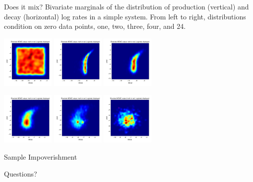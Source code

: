 \documentclass[12pt,a4paper,t,xcolor=dvipsnames,slidestop,compress,mathserif]{beamer}
\begin{document}
\begin{frame}{Does it mix?}
Bivariate marginals of the distribution of production (vertical) and decay (horizontal) log rates in a simple system. From left to right, distributions condition on zero data points, one, two, three, four, and 24.
\begin{center}
\includegraphics[height=1in,width=1in]{simple_million_stagewise_plots/dist0_contour_decay_prod.png}
\includegraphics[height=1in,width=1in]{simple_million_stagewise_plots/dist1_contour_decay_prod.png}
\includegraphics[height=1in,width=1in]{simple_million_stagewise_plots/dist2_contour_decay_prod.png}
\end{center}
\begin{center}
\includegraphics[height=1in,width=1in]{simple_million_stagewise_plots/dist3_contour_decay_prod.png}
\includegraphics[height=1in,width=1in]{simple_million_stagewise_plots/dist4_contour_decay_prod.png}
\includegraphics[height=1in,width=1in]{simple_million_stagewise_plots/dist23_contour_decay_prod.png}
\end{center}
\end{frame}
\begin{frame}{Sample Impoverishment}

\end{frame}

\begin{frame}[allowframebreaks]{Questions?}


\begin{center}

\end{center}
\end{frame}
\end{document}
